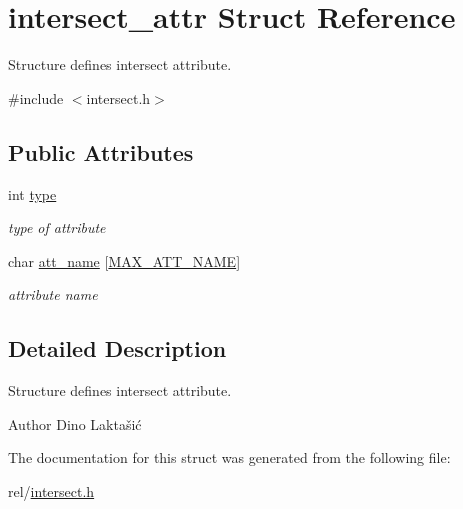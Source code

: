 \hypertarget{structintersect__attr}{}\section{intersect\+\_\+attr Struct Reference}
\label{structintersect__attr}


Structure defines intersect attribute.  




{\ttfamily \#include $<$intersect.\+h$>$}

\subsection*{Public Attributes}
\begin{DoxyCompactItemize}
\item 
\mbox{\label{structintersect__attr_a309cf5c27cb6bad9d421e0cec60a733f}} 
int \hyperlink{structintersect__attr_a309cf5c27cb6bad9d421e0cec60a733f}{type}
\begin{DoxyCompactList}\small\item\em type of attribute \end{DoxyCompactList}\item 
\mbox{\label{structintersect__attr_a2def8cfafc023b1052438588af1d38b1}} 
char \hyperlink{structintersect__attr_a2def8cfafc023b1052438588af1d38b1}{att\+\_\+name} \mbox{[}\hyperlink{constants_8h_ad221251e45ce1d6bfb3eff3b142c0fcd}{M\+A\+X\+\_\+\+A\+T\+T\+\_\+\+N\+A\+ME}\mbox{]}
\begin{DoxyCompactList}\small\item\em attribute name \end{DoxyCompactList}\end{DoxyCompactItemize}


\subsection{Detailed Description}
Structure defines intersect attribute. 

\begin{DoxyAuthor}{Author}
Dino Laktašić 
\end{DoxyAuthor}


The documentation for this struct was generated from the following file\+:\begin{DoxyCompactItemize}
\item 
rel/\hyperlink{intersect_8h}{intersect.\+h}\end{DoxyCompactItemize}
